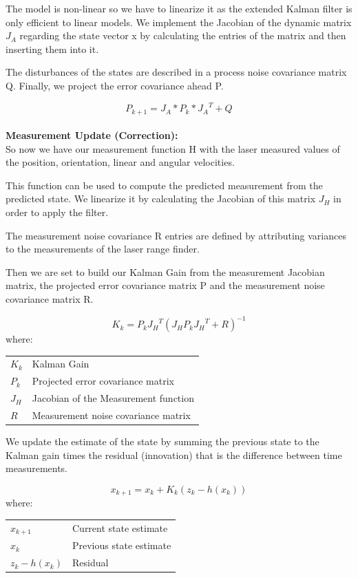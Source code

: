 \documentclass[a4paper]{IEEEtran}
\makeatletter
\newenvironment{conditions}
  {\par\vspace{\abovedisplayskip}\noindent\begin{tabular}{>{$}l<{$} @{${}={}$} l}}
  {\end{tabular}\par\vspace{\belowdisplayskip}}
\makeatother
\begin{document}
The model is non-linear so we have to linearize it as the extended Kalman filter is only efficient to linear models. We implement the Jacobian of the dynamic matrix $J^{}_A$ regarding the state vector x by calculating the entries of the matrix and then inserting them into it.

The disturbances of the states are described in a process noise covariance matrix Q.
Finally, we project the error covariance ahead P.

\begin{equation}
P_{k+1}=J^{}_A * P_k * {J^{}_A}^T + Q
\end{equation}
\\

\textbf{Measurement Update (Correction):}\\

So now we have our measurement function H with the laser measured values of the position, orientation, linear and angular velocities.


This function can be used to compute the predicted measurement from the predicted state. We linearize it by calculating the Jacobian of this matrix $J^{}_H$ in order to apply the filter.


The measurement noise covariance R entries are defined by attributing variances to the measurements of the laser range finder.


Then we are set to build our Kalman Gain from the measurement Jacobian matrix, the projected error covariance matrix P and the measurement noise covariance matrix R.

\begin{equation}
K_{k}=P_k{J^{}_H}^T(J^{}_HP_k{J^{}_H}^T + R)^{-1}
\end{equation}
where:
\begin{conditions}
 K_{k}     &  Kalman Gain \\
 P_k     &  Projected error covariance matrix \\   
 {J^{}_H} &  Jacobian of the Measurement function \\
 R     &  Measurement noise covariance matrix
\end{conditions}

We update the estimate of the state by summing the previous state to the Kalman gain times the residual (innovation) that is the difference between time measurements. 

\begin{equation}
x_{k+1}=x_{k}+K_{k}(z_{k}-h(x_{k}))
\end{equation}
where:
\begin{conditions}
 x_{k+1}     &  Current state estimate \\
 x_{k}     &  Previous state estimate \\   
 z_{k}-h(x_{k}) &  Residual
\end{conditions}
\end{document}
